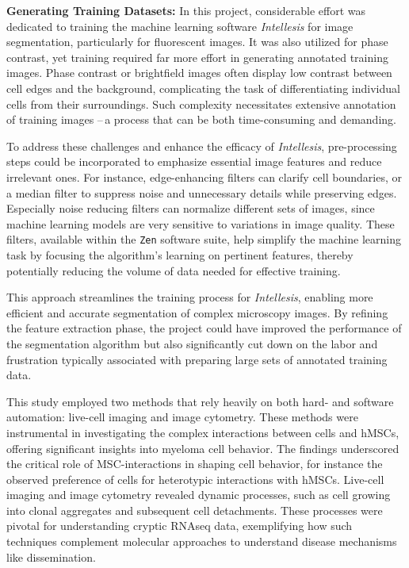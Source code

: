 \textbf{Generating Training Datasets:}
In this project, considerable effort was dedicated to training the machine
learning software \textit{Intellesis} for image segmentation, particularly for
fluorescent images. It was also utilized for phase contrast, yet training
required far more effort in generating annotated training images. Phase contrast
or brightfield images often display low contrast between cell edges and the
background, complicating the task of differentiating individual cells from their
surroundings. Such complexity necessitates extensive annotation of training
images --\,a process that can be both time-consuming and demanding.

To address these challenges and enhance the efficacy of \textit{Intellesis},
pre-processing steps could be incorporated to emphasize essential image features
and reduce irrelevant ones. For instance, edge-enhancing filters can
clarify cell boundaries, or a median filter to suppress noise and
unnecessary details while preserving edges. Especially noise reducing filters
can normalize different sets of images, since machine learning models are
very sensitive to variations in image quality.
These filters, available within the
\texttt{Zen} software suite, help simplify the machine learning task by focusing
the algorithm’s learning on pertinent features, thereby potentially reducing the
volume of data needed for effective training.

This approach streamlines the training process for \textit{Intellesis}, enabling
more efficient and accurate segmentation of complex microscopy images. By
refining the feature extraction phase, the project could have improved the
performance of the segmentation algorithm but also significantly cut down on the
labor and frustration typically associated with preparing large sets of
annotated training data.




%
\label{sec:discussion_conclusion_microscopy}%
This study employed two methods that rely heavily on both hard- and software
automation: live-cell imaging and image cytometry. These methods were
instrumental in investigating the complex interactions between \INA cells and
hMSCs, offering significant insights into myeloma cell behavior. The findings
underscored the critical role of MSC-interactions in shaping cell behavior, for
instance the observed preference of \INA cells for heterotypic interactions with
hMSCs. Live-cell imaging and image cytometry revealed dynamic processes, such as
\INA cell growing into clonal aggregates and subsequent cell detachments. These
processes were pivotal for understanding cryptic RNAseq data, exemplifying how
such techniques complement molecular approaches to understand disease mechanisms
like dissemination.

